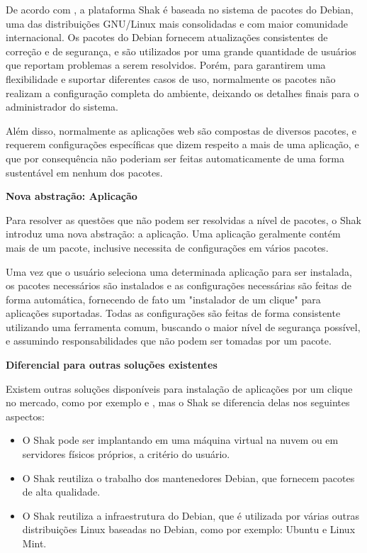 De acordo com \cite{shak2015}, a plataforma Shak é baseada no sistema de pacotes
do Debian, uma das distribuições GNU/Linux mais consolidadas e com maior comunidade internacional. Os
pacotes do Debian fornecem atualizações consistentes de correção e de segurança,
e são utilizados por uma grande quantidade de usuários que reportam problemas a
serem resolvidos. Porém, para garantirem uma flexibilidade e suportar diferentes
casos de uso, normalmente os pacotes não realizam a configuração completa do ambiente,
deixando os detalhes finais para o administrador do sistema.

Além disso, normalmente as aplicações web são compostas de diversos pacotes, e
requerem configurações  específicas que dizem respeito a mais de uma aplicação,
e que por consequência não poderiam ser feitas automaticamente de uma forma sustentável em nenhum dos pacotes.

\textbf{Nova abstração: Aplicação}

Para resolver as questões que não podem ser resolvidas a nível de pacotes, o
Shak introduz uma nova abstração: a aplicação. Uma aplicação geralmente
contém mais de um pacote, inclusive necessita de configurações em vários pacotes.

Uma vez que o usuário seleciona uma determinada aplicação para
ser instalada, os pacotes necessários são instalados e as configurações
necessárias são feitas de forma automática, fornecendo de fato um "instalador
de um clique" para aplicações suportadas. Todas as configurações são feitas de
forma consistente utilizando uma ferramenta comum, buscando o maior nível de
segurança possível, e assumindo responsabilidades que não podem ser tomadas por
um pacote.

\textbf{Diferencial para outras soluções existentes}

Existem outras soluções disponíveis para instalação de aplicações por um clique no
mercado, como por exemplo \cite{bitnami} e \cite{sandstormio}, mas o Shak se
diferencia delas nos seguintes aspectos:

\begin{itemize}
  \item O Shak pode ser implantando em uma máquina virtual na nuvem ou em servidores físicos
    próprios, a critério do usuário.

  \item O Shak reutiliza o trabalho dos mantenedores Debian, que fornecem pacotes
    de alta qualidade.

  \item O Shak reutiliza a infraestrutura do Debian, que é utilizada por várias
outras distribuições Linux baseadas no Debian, como por exemplo: Ubuntu e Linux Mint.

\end{itemize}

